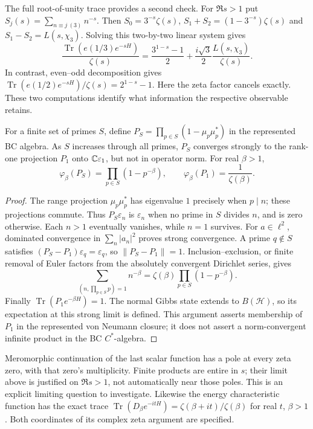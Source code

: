 The full root-of-unity trace provides a second check. For $\Re s>1$ put
$S_j(s)=\sum_{n\equiv j\ (3)}n^{-s}$. Then
$S_0=3^{-s}\zeta(s)$,
$S_1+S_2=(1-3^{-s})\zeta(s)$ and
$S_1-S_2=L(s,\chi_3)$. Solving this two-by-two linear system gives
\begin{equation}
 \frac{\operatorname{Tr}(e(1/3)e^{-sH})}{\zeta(s)}
 =\frac{3^{1-s}-1}{2}
   +\frac{i\sqrt3}{2}\frac{L(s,\chi_3)}{\zeta(s)}.
 \label{eq:rh-e3-trace}
\end{equation}
In contrast, even--odd decomposition gives
$\operatorname{Tr}(e(1/2)e^{-sH})/\zeta(s)=2^{1-s}-1$.
Here the zeta factor cancels exactly. These two computations identify what
information the respective observable retains.

\begin{proposition}
For a finite set of primes $S$, define
$P_S=\prod_{p\in S}(1-\mu_p\mu_p^*)$ in the represented BC algebra.
As $S$ increases through all primes, $P_S$ converges strongly to the
rank-one projection $P_1$ onto $\mathbb C\varepsilon_1$, but not in operator norm.
For real $\beta>1$,
\begin{equation}
 \varphi_\beta(P_S)=\prod_{p\in S}(1-p^{-\beta}),\qquad
 \varphi_\beta(P_1)=\frac1{\zeta(\beta)}.
 \label{eq:rh-prime-projectors}
\end{equation}
\end{proposition}
\begin{proof}
The range projection $\mu_p\mu_p^*$ has eigenvalue $1$ precisely when $p\mid n$;
these projections commute. Thus $P_S\varepsilon_n$ is $\varepsilon_n$ when
no prime in $S$ divides $n$, and is zero otherwise. Each $n>1$ eventually
vanishes, while $n=1$ survives. For $a\in\ell^2$, dominated convergence in
$\sum_n|a_n|^2$ proves strong convergence. A prime $q\notin S$ satisfies
$(P_S-P_1)\varepsilon_q=\varepsilon_q$, so $\|P_S-P_1\|=1$.
Inclusion--exclusion, or finite removal of Euler factors from the absolutely
convergent Dirichlet series, gives
\[
 \sum_{(n,\prod_{p\in S}p)=1}n^{-\beta}
 =\zeta(\beta)\prod_{p\in S}(1-p^{-\beta}).
\]
Finally $\operatorname{Tr}(P_1e^{-\beta H})=1$. The normal Gibbs state extends
to $B(\mathcal H)$, so its expectation at this strong limit is defined.
This argument asserts membership of $P_1$ in the represented von Neumann
closure; it does not assert a norm-convergent infinite product in the BC
$C^*$-algebra.
\end{proof}

Meromorphic continuation of the last scalar function has a pole at every
zeta zero, with that zero's multiplicity. Finite products are entire in $s$;
their limit above is justified on $\Re s>1$, not automatically near those
poles. This is an explicit limiting question to investigate.
Likewise the energy characteristic function has the exact trace
$\operatorname{Tr}(D_\beta e^{-itH})=\zeta(\beta+it)/\zeta(\beta)$ for
real $t$, $\beta>1$. Both coordinates of its complex zeta argument are specified.

